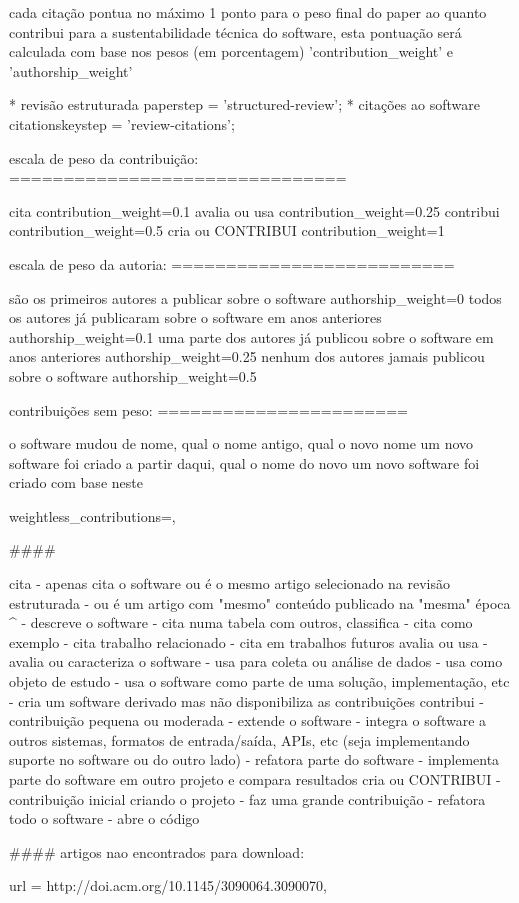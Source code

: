 cada citação pontua no máximo 1 ponto para o peso final do paper ao quanto
contribui para a sustentabilidade técnica do software, esta pontuação será
calculada com base nos pesos (em porcentagem) 'contribution_weight' e
'authorship_weight'


* revisão estruturada
   paper{step} = 'structured-review';
* citações ao software
   citations{key}{step} = 'review-citations';

escala de peso da contribuição:
===============================

cita
  contribution_weight=0.1
avalia ou usa
  contribution_weight=0.25
contribui
  contribution_weight=0.5
cria ou CONTRIBUI
  contribution_weight=1

escala de peso da autoria:
==========================

são os primeiros autores a publicar sobre o software
  authorship_weight=0
todos os autores já publicaram sobre o software em anos anteriores
  authorship_weight=0.1
uma parte dos autores já publicou sobre o software em anos anteriores
  authorship_weight=0.25
nenhum dos autores jamais publicou sobre o software
  authorship_weight=0.5

contribuições sem peso:
=======================

o software mudou de nome, qual o nome antigo, qual o novo nome
um novo software foi criado a partir daqui, qual o nome do novo
um novo software foi criado com base neste

  weightless_contributions={},

####

cita
  - apenas cita o software ou é o mesmo artigo selecionado na revisão estruturada
  - ou é um artigo com "mesmo" conteúdo publicado na "mesma" época ^
  - descreve o software
  - cita numa tabela com outros, classifica
  - cita como exemplo
  - cita trabalho relacionado
  - cita em trabalhos futuros
avalia ou usa
  - avalia ou caracteriza o software
  - usa para coleta ou análise de dados
  - usa como objeto de estudo
  - usa o software como parte de uma solução, implementação, etc
  - cria um software derivado mas não disponibiliza as contribuições
contribui
  - contribuição pequena ou moderada
  - extende o software
  - integra o software a outros sistemas, formatos de entrada/saída, APIs, etc
    (seja implementando suporte no software ou do outro lado)
  - refatora parte do software
  - implementa parte do software em outro projeto e compara resultados
cria ou CONTRIBUI
  - contribuição inicial criando o projeto
  - faz uma grande contribuição
  - refatora todo o software
  - abre o código


#### artigos nao encontrados para download:

  url = {http://doi.acm.org/10.1145/3090064.3090070},
